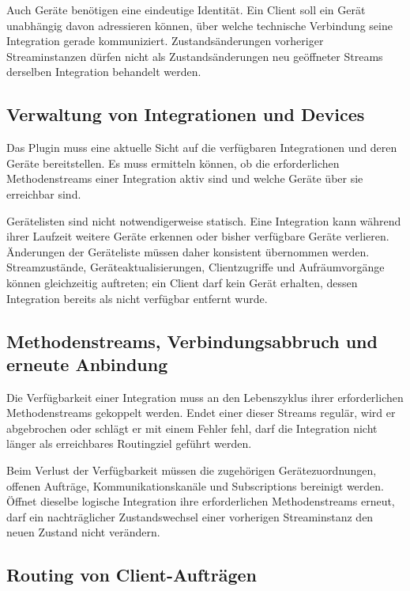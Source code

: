 Auch Geräte benötigen eine eindeutige Identität. Ein Client soll ein Gerät unabhängig davon adressieren können, über welche technische Verbindung seine Integration gerade kommuniziert. Zustandsänderungen vorheriger Streaminstanzen dürfen nicht als Zustandsänderungen neu geöffneter Streams derselben Integration behandelt werden.

\subsection{Verwaltung von Integrationen und Devices}

Das Plugin muss eine aktuelle Sicht auf die verfügbaren Integrationen und deren Geräte bereitstellen. Es muss ermitteln können, ob die erforderlichen Methodenstreams einer Integration aktiv sind und welche Geräte über sie erreichbar sind.

Gerätelisten sind nicht notwendigerweise statisch. Eine Integration kann während ihrer Laufzeit weitere Geräte erkennen oder bisher verfügbare Geräte verlieren. Änderungen der Geräteliste müssen daher konsistent übernommen werden. Streamzustände, Geräteaktualisierungen, Clientzugriffe und Aufräumvorgänge können gleichzeitig auftreten; ein Client darf kein Gerät erhalten, dessen Integration bereits als nicht verfügbar entfernt wurde.

\subsection{Methodenstreams, Verbindungsabbruch und erneute Anbindung}

Die Verfügbarkeit einer Integration muss an den Lebenszyklus ihrer erforderlichen Methodenstreams gekoppelt werden. Endet einer dieser Streams regulär, wird er abgebrochen oder schlägt er mit einem Fehler fehl, darf die Integration nicht länger als erreichbares Routingziel geführt werden.

Beim Verlust der Verfügbarkeit müssen die zugehörigen Gerätezuordnungen, offenen Aufträge, Kommunikationskanäle und Subscriptions bereinigt werden. Öffnet dieselbe logische Integration ihre erforderlichen Methodenstreams erneut, darf ein nachträglicher Zustandswechsel einer vorherigen Streaminstanz den neuen Zustand nicht verändern.

\subsection{Routing von Client-Aufträgen}

